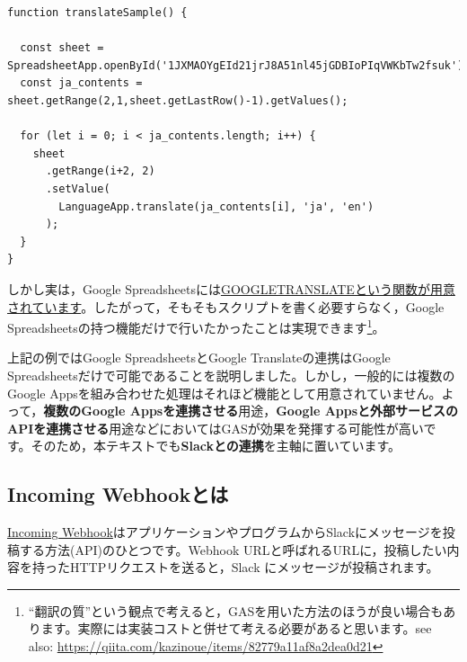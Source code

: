 \documentclass[uplatex,a4j]{jsarticle}
\begin{document}
 \begin{lstlisting}[basicstyle=\ttfamily\footnotesize,frame=single,caption=Translate Script Sample]
function translateSample() {

  const sheet = SpreadsheetApp.openById('1JXMAOYgEId21jrJ8A51nl45jGDBIoPIqVWKbTw2fsuk').getSheetByName('GAS');
  const ja_contents = sheet.getRange(2,1,sheet.getLastRow()-1).getValues();
  
  for (let i = 0; i < ja_contents.length; i++) {
    sheet
      .getRange(i+2, 2)
      .setValue(
        LanguageApp.translate(ja_contents[i], 'ja', 'en')
      );
  }
}
 \end{lstlisting}


しかし実は，Google Spreadsheetsには\href{https://support.google.com/docs/answer/3093331?hl=ja}{GOOGLETRANSLATEという関数が用意されています}。したがって，そもそもスクリプトを書く必要すらなく，Google Spreadsheetsの持つ機能だけで行いたかったことは実現できます\footnote{``翻訳の質''という観点で考えると，GASを用いた方法のほうが良い場合もあります。実際には実装コストと併せて考える必要があると思います。see also: \href{https://qiita.com/kazinoue/items/82779a11af8a2dea0d21}{https://qiita.com/kazinoue/items/82779a11af8a2dea0d21}}。


上記の例ではGoogle SpreadsheetsとGoogle Translateの連携はGoogle Spreadsheetsだけで可能であることを説明しました。しかし，一般的には複数のGoogle Appsを組み合わせた処理はそれほど機能として用意されていません。よって，\textbf{複数のGoogle Appsを連携させる}用途，\textbf{Google Appsと外部サービスのAPIを連携させる}用途などにおいてはGASが効果を発揮する可能性が高いです。そのため，本テキストでも\textbf{Slackとの連携}を主軸に置いています。

\clearpage
\subsection{Incoming Webhookとは}

\href{https://api.slack.com/messaging/webhooks}{Incoming Webhook}はアプリケーションやプログラムからSlackにメッセージを投稿する方法(API)のひとつです。Webhook URLと呼ばれるURLに，投稿したい内容を持ったHTTPリクエストを送ると，Slack にメッセージが投稿されます。
\end{document}
